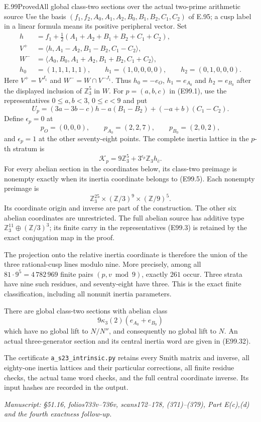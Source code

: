 \begin{statement}{E.99}{Proved}{All global class-two sections over the actual two-prime arithmetic source}
Use the basis
$(f_1,f_2,A_0,A_1,A_2,B_0,B_1,B_2,C_1,C_2)$ of E.95;
a cusp label in a linear formula means its positive
peripheral vector. Set
\[
 \begin{split}
 h&=f_1+\tfrac12(A_1+A_2+B_1+B_2+C_1+C_2),\\
 V^+&=\langle h,A_1-A_2,B_1-B_2,C_1-C_2\rangle,\\
 W^-&=\langle A_0,B_0,A_1+A_2,B_1+B_2,C_1+C_2\rangle,\\
 h_0&=(1,1,1,1,1),\qquad
 h_1=(1,0,0,0,0),\qquad h_2=(0,1,0,0,0).
 \end{split}                                               \tag{E99.2}
\]
Here $V^+=V^{J_1}$ and $W^-=W\cap V^{-J_1}$.
Thus $h_0=-e_O$, $h_1=e_{A_0}$ and $h_2=e_{B_0}$
after the displayed inclusion of $\mathbb Z_3^5$ in $W$.
For $p=(a,b,c)$ in (E99.1), use the representatives
$0\leq a,b<3$, $0\leq c<9$ and put
\[
 U_p=(3a-3b-c)h-a(B_1-B_2)+(-a+b)(C_1-C_2).
 \tag{E99.3}
\]
Define $\epsilon_p=0$ at
\[
 p_O=(0,0,0),\qquad p_{A_0}=(2,2,7),\qquad
 p_{B_0}=(2,0,2),                                         \tag{E99.4}
\]
and $\epsilon_p=1$ at the other seventy-eight points.
The complete inertia lattice in the $p$-th stratum is
\[
 \boxed{\quad
 \mathscr K_p=9\mathbb Z_3^5+
                    3^{\epsilon_p}\mathbb Z_3h_{\bar c}.
 \quad}                                                    \tag{E99.5}
\]
For every abelian section in the coordinates below, its
class-two preimage is nonempty exactly when its inertia
coordinate belongs to (E99.5). Each nonempty preimage is
\[
          \mathbb Z_3^{25}\times
                  (\mathbb Z/3)^9\times(\mathbb Z/9)^5.
 \tag{E99.6}
\]
Its coordinate origin and inverse are part of the construction.
The other six abelian coordinates are unrestricted. The full
abelian source has additive type
$\mathbb Z_3^{11}\oplus(\mathbb Z/3)^3$; its finite carry
in the representatives (E99.3) is retained by the exact
conjugation map in the proof.

The projection onto the relative inertia coordinate is
therefore the union of the three rational-cusp lines
modulo nine. More precisely, among all
$81\cdot9^5=4\,782\,969$ finite pairs $(p,v\bmod9)$,
exactly $261$ occur. Three strata have nine such residues,
and seventy-eight have three. This is the exact finite
classification, including all nonunit inertia parameters.

There are global class-two sections with abelian class
\[
                    9\kappa_3(2)(e_{A_0}+e_{B_0})
 \tag{E99.7}
\]
which have no global lift to $N/N''$, and consequently no
global lift to $N$. An actual three-generator section and
its central inertia word are given in (E99.32).

The certificate \texttt{a\_s23\_intrinsic.py} retains every
Smith matrix and inverse, all eighty-one inertia lattices
and their particular corrections, all finite residue checks,
the actual tame word checks, and the full central coordinate
inverse. Its input hashes are recorded in the output.

\emph{Manuscript: \S51.16, folios733v--736v, scans172--178,
(371)--(379), Part E(c),(d) and the fourth exactness follow-up.}
\end{statement}
